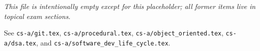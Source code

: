 


\question[1]
\textit{This file is intentionally empty except for this placeholder; all former items live in topical exam sections.}
\makeemptybox{0.25in}
\begin{solution}
  See \texttt{cs-a/git.tex}, \texttt{cs-a/procedural.tex}, \texttt{cs-a/object\_oriented.tex}, \texttt{cs-a/dsa.tex}, and \texttt{cs-a/software\_dev\_life\_cycle.tex}.
\end{solution}

